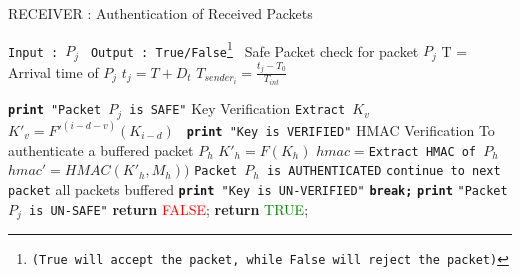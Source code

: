 	
\begin{algorithm}[H] %
\caption{RECEIVER : Authentication of Received Packets}
\begin{algorithmic}[1]
\State \texttt{Input : $P_{j}$ }
\State \texttt{Output : True/False\footnote{(True will accept the packet, while False will reject the packet)} }
\State
{}
\State Safe Packet check for packet $P_{j}$ 
\State T =  Arrival time of $P_{j}$
\State \texttt{$t_{j}=T+D_{t}$}
\State \texttt{$T_{sender_{i}}= \frac{ t_{j} - T_{0} } { T_{int} }  $}

    \State\texttt{\textbf{print} "Packet $P_{j}$ is SAFE"}
    \State Key Verification
    \State \texttt{Extract $K_{v}$}
    \State \texttt{$K'_{v}=F'^{(i-d-v)}(K_{i-d})$ }
            \State \texttt{\textbf{print} "Key is VERIFIED"}
            \State HMAC Verification
            \State To authenticate a buffered packet $P_{h}$ 
                \State \texttt{$K'_{h}=F(K_{h})$}
                \State $hmac=$\texttt{Extract HMAC of $P_{h}$}
                \State $hmac' =HMAC(K'_{h},M_{h}))$
                  \texttt{Packet $P_{h}$ is AUTHENTICATED}
                \Else
                    \texttt{continue to next packet}
                \EndIf
            \EndFor all packets buffered
        \Else 
            \State \texttt{\textbf{print} "Key is UN-VERIFIED"}
             \State \textbf\texttt{{break;}}
        \EndIf
\Else 
        \State \textbf{\texttt{print}} \texttt{"Packet $P_{j}$ is UN-SAFE"}
        \State \textbf{return} \textcolor{red}{FALSE};
    \EndIf
\State \textbf{return} \textcolor{green}{TRUE};
\EndProcedure
\label{ReceiverTeslaAlgo}
\end{algorithmic}
\end{algorithm}




